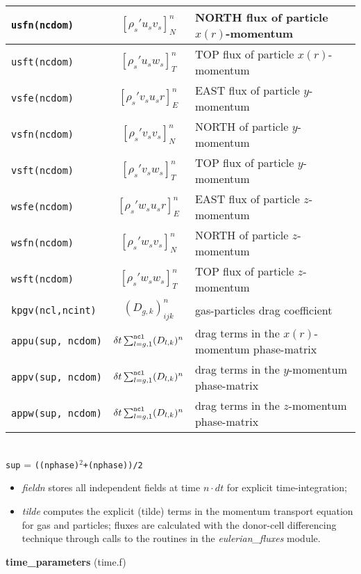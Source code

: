 \begin{tabular}{|p{4cm}|c|p{8cm}|}
\tt usfn(ncdom) & $\left[ \rho_s' u_s v_s \right]_{N}^n$ & NORTH flux of particle $x(r)$-momentum \\\hline
\tt usft(ncdom) & $\left[ \rho_s' u_s w_s \right]_{T}^n$ & TOP flux of particle $x(r)$-momentum \\\hline
\tt vsfe(ncdom) & $\left[ \rho_s' v_s u_s r \right]_{E}^n$ & EAST flux of particle $y$-momentum \\\hline
\tt vsfn(ncdom) & $\left[ \rho_s' v_s v_s \right]_{N}^n$ & NORTH of particle $y$-momentum \\\hline
\tt vsft(ncdom) & $\left[ \rho_s' v_s w_s \right]_{T}^n$ & TOP flux of particle $y$-momentum \\\hline
\tt wsfe(ncdom) & $\left[ \rho_s' w_s u_s r \right]_{E}^n$ & EAST flux of particle $z$-momentum \\\hline
\tt wsfn(ncdom) & $\left[ \rho_s' w_s v_s \right]_{N}^n$ & NORTH of particle $z$-momentum \\\hline
\tt wsft(ncdom) & $\left[ \rho_s' w_s w_s \right]_{T}^n$ & TOP flux of particle $z$-momentum \\\hline

\tt kpgv(ncl,ncint) & $(D_{g,k})^n_{ijk}$ & gas-particles drag coefficient\\\hline
\tt appu(sup, ncdom) & $\delta t\sum_{l=g,1}^{\tt ncl}(D_{l,k})^n$ & drag terms in the $x(r)$-momentum phase-matrix\\\hline
\tt appv(sup, ncdom) &  $\delta t\sum_{l=g,1}^{\tt ncl}(D_{l,k})^n$ & drag terms in the $y$-momentum phase-matrix\\\hline
\tt appw(sup, ncdom) &  $\delta t\sum_{l=g,1}^{\tt ncl}(D_{l,k})^n$ & drag terms in the $z$-momentum phase-matrix\\\hline
\end{tabular}\\
{\tt sup} = {\tt ((nphase)$^2$+(nphase))/2}
\begin{itemize}
\item{\em fieldn} stores all independent fields at time $n\cdot dt$ for explicit time-integration;
\item{\em tilde} computes the explicit (tilde) terms in the momentum transport equation for gas and particles; fluxes are calculated with the donor-cell differencing technique through calls to the routines in the {\em eulerian\_fluxes} module.
\end{itemize}
%
%
{\large{\bf time\_parameters}} (time.f)\\[5mm]
